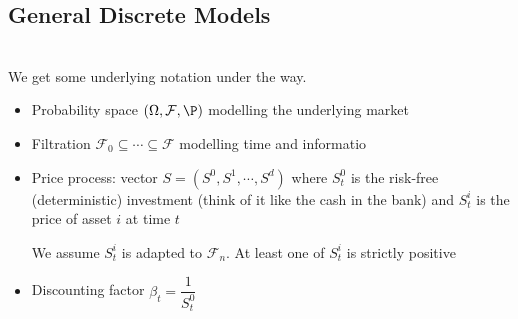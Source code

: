 \subsection{General Discrete Models}\hfill\\
\noindent We get some underlying notation under the way.
\par\bigskip
\begin{itemize}
  \item Probability space $(\Omega, \mathcal{F}, \P)$ modelling the underlying market
    \par\bigskip
  \item Filtration $\mathcal{F}_0\subseteq\cdots\subseteq\mathcal{F}$ modelling time and informatio
    \par\bigskip
  \item Price process: vector $S = (S^0,S^1,\cdots,S^d)$ where $S_t^0$ is the risk-free (deterministic) investment (think of it like the cash in the bank) and $S_t^i$ is the price of asset $i$ at time $t$\par
    \noindent We assume $S_t^i$ is adapted to $\mathcal{F}_n$. At least one of $S_t^i$ is strictly positive
    \par\bigskip
  \item Discounting factor $\beta_t = \dfrac{1}{S_t^0}$
\end{itemize}
\par\bigskip
